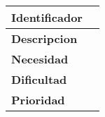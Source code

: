 \begin{center}
    \begin{tabular}{|p{3cm}|p{5cm}|}
    \hline 
    \textbf{Identificador} & \\ \hline
    \textbf{Descripcion} & \\ \hline
    \textbf{Necesidad} & \\ \hline
    \textbf{Dificultad} & \\ \hline
    \textbf{Prioridad} & \\ \hline
    \end{tabular}
\end{center}
